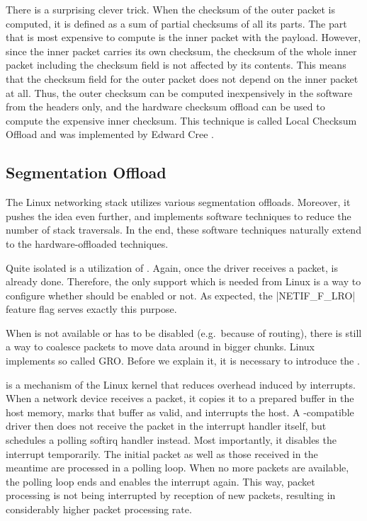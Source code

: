There is a surprising clever trick. When the checksum of the outer packet is
computed, it is defined as a sum of partial checksums of all its parts. The
part that is most expensive to compute is the inner  packet with the payload.
However, since the inner packet carries its own checksum, the checksum of the
whole inner packet including the checksum field is not affected by its
contents. This means that the checksum field for the outer packet does not
depend on the inner  packet at all. Thus, the outer checksum can be
computed inexpensively in the software from the headers only, and the hardware
checksum offload can be used to compute the expensive inner checksum. This
technique is called Local Checksum Offload and was implemented by Edward
Cree \cite{linux-lco}.

\subsection{Segmentation Offload}

The Linux networking stack utilizes various segmentation offloads.
Moreover, it pushes the idea even further, and implements software techniques
to reduce the number of stack traversals. In the end, these software techniques
naturally extend to the hardware-offloaded techniques.

Quite isolated is a utilization of . Again, once the driver
receives a packet,  is already done. Therefore, the only support which is
needed from Linux is a way to configure whether  should be enabled or
not. As expected, the \macro|NETIF_F_LRO| feature flag serves exactly this
purpose.

When  is not available or has to be disabled (e.g.\ because of routing),
there is still a way to coalesce packets to move data around in bigger chunks.
Linux implements so called \acrfull{GRO}. Before we explain it, it is necessary
to introduce the .

 is a mechanism of the Linux kernel that reduces overhead induced by interrupts. When
a network device receives a packet, it copies it to a prepared 
buffer in the host memory, marks that buffer as valid, and interrupts the host.
A -compatible driver then does not receive the packet in the interrupt
handler itself, but schedules a polling softirq handler instead. Most
importantly, it disables the interrupt temporarily. The initial packet as well
as those received in the meantime are processed in a polling
loop. When no more packets are available, the polling loop ends and enables the
interrupt again. This way, packet processing is not being interrupted by
reception of new packets, resulting in considerably higher packet processing
rate.

